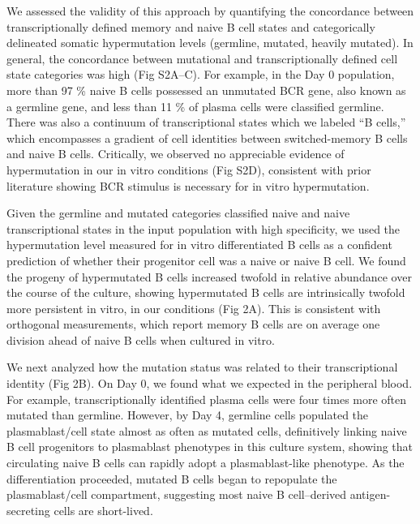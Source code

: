 We assessed the validity of this approach by quantifying the concordance between transcriptionally defined memory and naive B cell states and categorically delineated somatic hypermutation levels (germline, mutated, heavily mutated). In general, the concordance between mutational and transcriptionally defined cell state categories was high (Fig S2A–C). For example, in the Day 0 population, more than 97 \% naive B cells possessed an unmutated BCR gene, also known as a germline gene, and less than 11 \% of plasma cells were classified germline. There was also a continuum of transcriptional states which we labeled “B cells,” which encompasses a gradient of cell identities between switched-memory B cells and naive B cells. Critically, we observed no appreciable evidence of hypermutation in our in vitro conditions (Fig S2D), consistent with prior literature showing BCR stimulus is necessary for in vitro hypermutation\cite{bergthorsdottir_signals_2001}.


Given the germline and mutated categories classified naive and naive transcriptional states in the input population with high specificity, we used the hypermutation level measured for in vitro differentiated B cells as a confident prediction of whether their progenitor cell was a naive or naive B cell. We found the progeny of hypermutated B cells increased twofold in relative abundance over the course of the culture, showing hypermutated B cells are intrinsically twofold more persistent in vitro, in our conditions (Fig 2A). This is consistent with orthogonal measurements, which report memory B cells are on average one division ahead of naive B cells when cultured in vitro\cite{tangye_intrinsic_2003}.


We next analyzed how the mutation status was related to their transcriptional identity (Fig 2B). On Day 0, we found what we expected in the peripheral blood. For example, transcriptionally identified plasma cells were four times more often mutated than germline. However, by Day 4, germline cells populated the plasmablast/cell state almost as often as mutated cells, definitively linking naive B cell progenitors to plasmablast phenotypes in this culture system, showing that circulating naive B cells can rapidly adopt a plasmablast-like phenotype. As the differentiation proceeded, mutated B cells began to repopulate the plasmablast/cell compartment, suggesting most naive B cell–derived antigen-secreting cells are short-lived.

